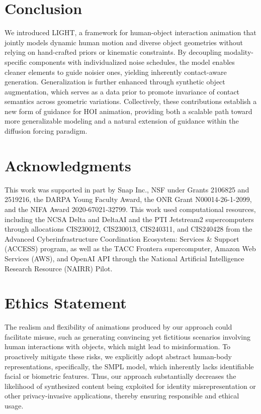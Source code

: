 \section{Conclusion}\label{sec:conclusion}
We introduced LIGHT, a framework for human-object interaction animation that jointly models dynamic human motion and diverse object geometries without relying on hand-crafted priors or kinematic constraints. By decoupling modality-specific components with individualized noise schedules, the model enables cleaner elements to guide noisier ones, yielding inherently contact-aware generation. Generalization is further enhanced through synthetic object augmentation, which serves as a data prior to promote invariance of contact semantics across geometric variations. Collectively, these contributions establish a new form of guidance for HOI animation, providing both a scalable path toward more generalizable modeling and a natural extension of guidance within the diffusion forcing paradigm.

\section*{Acknowledgments} 

This work was supported in part by Snap Inc., NSF under Grants 2106825 and 2519216, the DARPA Young Faculty Award, the ONR Grant N00014-26-1-2099, and the NIFA Award 2020-67021-32799. This work used computational resources, including the NCSA Delta and DeltaAI and the PTI Jetstream2 supercomputers through allocations CIS230012, CIS230013, CIS240311, and CIS240428 from the Advanced Cyberinfrastructure Coordination Ecosystem: Services \& Support (ACCESS) program, as well as the TACC Frontera supercomputer, Amazon Web Services (AWS), and OpenAI API through the National Artificial Intelligence Research Resource (NAIRR) Pilot.

\section*{Ethics Statement}
The realism and flexibility of animations produced by our approach could facilitate misuse, such as generating convincing yet fictitious scenarios involving human interactions with objects, which might lead to misinformation. To proactively mitigate these risks, we explicitly adopt abstract human-body representations, specifically, the SMPL model, which inherently lacks identifiable facial or biometric features. Thus, our approach substantially decreases the likelihood of synthesized content being exploited for identity misrepresentation or other privacy-invasive applications, thereby ensuring responsible and ethical usage.


